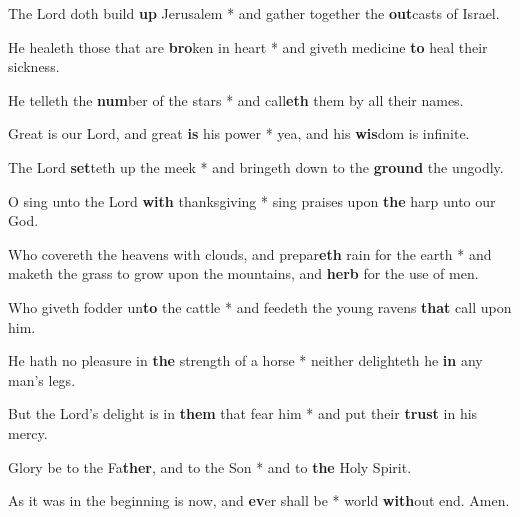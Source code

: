 \begin{multicols}{2}
	The Lord doth build \textbf{up} Jerusalem * and gather together the \textbf{out}casts of Israel.
	
	He healeth those that are \textbf{bro}ken in heart * and giveth medicine \textbf{to} heal their sickness.
	
	He telleth the \textbf{num}ber of the stars * and call\textbf{eth} them by all their names.
	
	Great is our Lord, and great \textbf{is} his power * yea, and his \textbf{wis}dom is infinite.
	
	The Lord \textbf{set}teth up the meek * and bringeth down to the \textbf{ground} the ungodly.
	
	O sing unto the Lord \textbf{with} thanksgiving * sing praises upon \textbf{the} harp unto our God.
	
	Who covereth the heavens with clouds, and prepar\textbf{eth} rain for the earth * and maketh the grass to grow upon the mountains, and \textbf{herb} for the use of men.
	
	Who giveth fodder un\textbf{to} the cattle * and feedeth the young ravens \textbf{that} call upon him.
	
	He hath no pleasure in \textbf{the} strength of a horse * neither delighteth he \textbf{in} any man's legs.
	
	But the Lord's delight is in \textbf{them} that fear him * and put their \textbf{trust} in his mercy.
	
	Glory be to the Fa\textbf{ther}, and to the Son * and to \textbf{the} Holy Spirit.
	
	As it was in the beginning is now, and \textbf{ev}er shall be * world \textbf{with}out end. Amen.
\end{multicols}